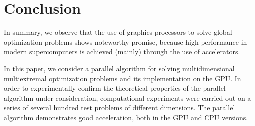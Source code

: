 \documentclass{svproc}
\begin{document}
\section{Conclusion}

In summary, we observe that the use of graphics processors to solve global optimization problems shows noteworthy promise, because high performance in modern supercomputers is achieved (mainly) through the use of accelerators.

In this paper, we consider a parallel algorithm for solving multidimensional multiextremal optimization problems and its implementation on the GPU. In order to experimentally confirm the theoretical properties of the parallel algorithm under consideration, computational experiments were carried out on a series of several hundred test problems of different dimensions. The parallel algorithm demonstrates good acceleration, both in the GPU and CPU versions.
\end{document}
